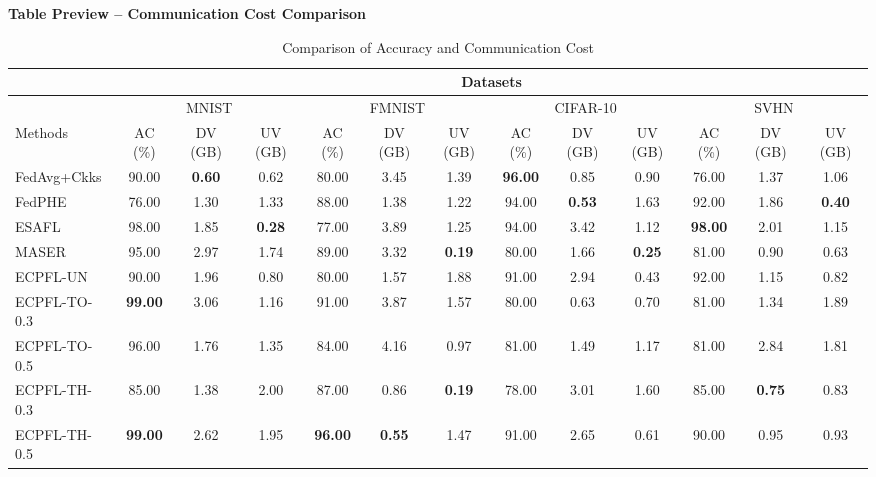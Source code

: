 \documentclass[conference]{IEEEtran}
\begin{document}
\onecolumn
\begin{center}
\Large\textbf{Table Preview -- Communication Cost Comparison}
\end{center}
\vspace{1em}
\begin{table}[t]
\centering
\caption{Comparison of Accuracy and Communication Cost}
\label{tab:comm-comparison}
\footnotesize

\begin{tabular}{|l|c|c|c|c|c|c|c|c|c|c|c|c|}
\hline
 & \multicolumn{12}{c|}{Datasets} \\
\hline
 & \multicolumn{3}{c|}{MNIST} & \multicolumn{3}{c|}{FMNIST} & \multicolumn{3}{c|}{CIFAR-10} & \multicolumn{3}{c|}{SVHN} \\
\hline
Methods & AC (\%) & DV (GB) & UV (GB) & AC (\%) & DV (GB) & UV (GB) & AC (\%) & DV (GB) & UV (GB) & AC (\%) & DV (GB) & UV (GB) \\
\hline
FedAvg+Ckks & 90.00 & \textbf{0.60} & 0.62 & 80.00 & 3.45 & 1.39 & \textbf{96.00} & 0.85 & 0.90 & 76.00 & 1.37 & 1.06 \\
\hline
FedPHE & 76.00 & 1.30 & 1.33 & 88.00 & 1.38 & 1.22 & 94.00 & \textbf{0.53} & 1.63 & 92.00 & 1.86 & \textbf{0.40} \\
\hline
ESAFL & 98.00 & 1.85 & \textbf{0.28} & 77.00 & 3.89 & 1.25 & 94.00 & 3.42 & 1.12 & \textbf{98.00} & 2.01 & 1.15 \\
\hline
MASER & 95.00 & 2.97 & 1.74 & 89.00 & 3.32 & \textbf{0.19} & 80.00 & 1.66 & \textbf{0.25} & 81.00 & 0.90 & 0.63 \\
\hline
ECPFL-UN & 90.00 & 1.96 & 0.80 & 80.00 & 1.57 & 1.88 & 91.00 & 2.94 & 0.43 & 92.00 & 1.15 & 0.82 \\
\hline
ECPFL-TO-0.3 & \textbf{99.00} & 3.06 & 1.16 & 91.00 & 3.87 & 1.57 & 80.00 & 0.63 & 0.70 & 81.00 & 1.34 & 1.89 \\
\hline
ECPFL-TO-0.5 & 96.00 & 1.76 & 1.35 & 84.00 & 4.16 & 0.97 & 81.00 & 1.49 & 1.17 & 81.00 & 2.84 & 1.81 \\
\hline
ECPFL-TH-0.3 & 85.00 & 1.38 & 2.00 & 87.00 & 0.86 & \textbf{0.19} & 78.00 & 3.01 & 1.60 & 85.00 & \textbf{0.75} & 0.83 \\
\hline
ECPFL-TH-0.5 & \textbf{99.00} & 2.62 & 1.95 & \textbf{96.00} & \textbf{0.55} & 1.47 & 91.00 & 2.65 & 0.61 & 90.00 & 0.95 & 0.93 \\
\hline
\end{tabular}
\end{table}
\end{document}
